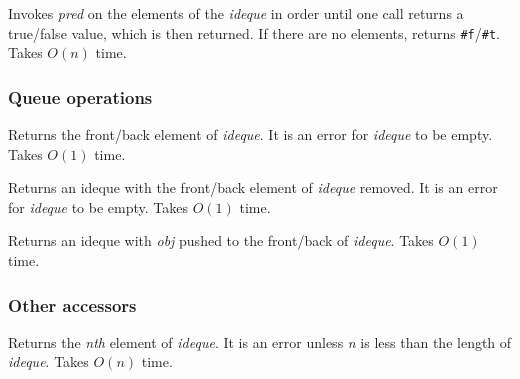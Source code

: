 \begin{entry}{%
  }

  Invokes \emph{pred} on the elements of the \emph{ideque} in order
  until one call returns a true/false value, which is then
  returned. If there are no elements, returns
  \texttt{\#f}/\texttt{\#t}. Takes $O(n)$ time.
\end{entry}

\subsubsection{Queue operations}

\begin{entry}{%
  }

  Returns the front/back element of \emph{ideque}. It is an error for
  \emph{ideque} to be empty. Takes $O(1)$ time.
\end{entry}

\begin{entry}{%
  }

  Returns an ideque with the front/back element of \emph{ideque}
  removed.  It is an error for \emph{ideque} to be empty. Takes $O(1)$
  time.
\end{entry}

\begin{entry}{%
  }

  Returns an ideque with \emph{obj} pushed to the front/back of
  \emph{ideque}. Takes $O(1)$ time.
\end{entry}

\subsubsection{Other accessors}

\begin{entry}{%
  }

  Returns the \emph{nth} element of \emph{ideque}. It is an error
  unless \emph{n} is less than the length of \emph{ideque}. Takes $O(n)$
  time.
\end{entry}


